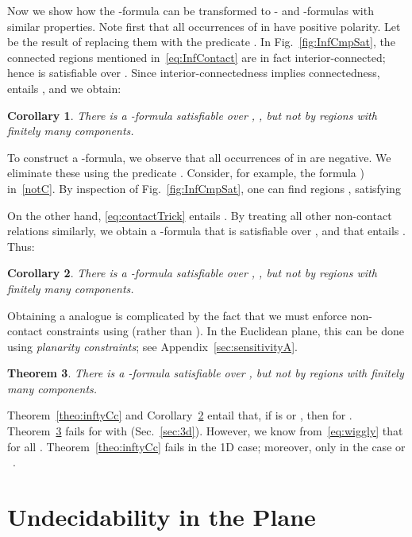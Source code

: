 \documentclass{article}
\newtheorem{theorem}{Theorem}
\newtheorem{corollary}[theorem]{Corollary}
\begin{document}
\vspace*{-2mm}

Now we show how the -formula  can be transformed
to - and -formulas with similar properties.  Note first
that all occurrences of  in  have positive polarity.
Let  be the result of replacing them with the
predicate . In Fig.~\ref{fig:InfCmpSat}, the connected regions
mentioned in~\eqref{eq:InfContact} are in fact interior-connected;
hence  is satisfiable over . Since
interior-connectedness implies connectedness, 
entails , and we obtain:
\begin{corollary}\label{cor:inftyCci}
There is a -formula 
satisfiable over , , but not by regions with finitely many components.
\end{corollary}

To construct a -formula, we observe
that all occurrences of  in  are negative. We eliminate
these using the predicate . Consider, for example, the formula
) in~\eqref{notC}.
By inspection of Fig.~\ref{fig:InfCmpSat},
one can find regions ,  satisfying

On the other hand, \eqref{eq:contactTrick} entails . By
treating all other non-contact relations similarly, we obtain a
-formula  that is satisfiable over , and
that entails . Thus:
\begin{corollary}\label{cor:inftyBc}
There is a -formula satisfiable over , ,
but not by regions with finitely many components.
\end{corollary}

Obtaining a  analogue is complicated by the fact that we must
enforce non-contact constraints using  (rather than ). In the
Euclidean plane, this can be done using \emph{planarity constraints};
see Appendix~\ref{sec:sensitivityA}.
\begin{theorem}\label{theo:inftyBci}
There is a -formula satisfiable over , but not by
regions with finitely many components.
\end{theorem}

Theorem~\ref{theo:inftyCc} and Corollary~\ref{cor:inftyBc} entail that, if
 is  or , then  for .  Theorem~\ref{theo:inftyBci}
fails for  with  (Sec.~\ref{sec:3d}).  However, we
know from~\eqref{eq:wiggly} that  for all . Theorem~\ref{theo:inftyCc}
fails in the 1D case; moreover, 
only in the case  or ~\cite{ijcai:kphz10}.





\section{Undecidability in the Plane}\label{sec:undecidability}
\end{document}
